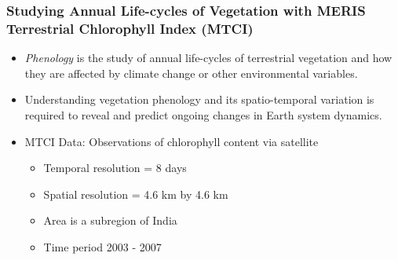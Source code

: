 \documentclass{beamer}
\begin{document}



\begin{frame}
\frametitle{Studying Annual Life-cycles of Vegetation with MERIS Terrestrial Chlorophyll Index (MTCI)}
\begin{itemize}
\item \emph{Phenology} is the study of annual life-cycles of terrestrial vegetation and how they are affected by climate change or other environmental variables.

\item Understanding vegetation phenology and its spatio-temporal variation is required to reveal and predict ongoing changes in Earth system dynamics. \\[0.5cm]

\item MTCI Data: Observations of chlorophyll content via satellite
\begin{itemize}
	\item Temporal resolution = 8 days
	\item Spatial resolution = 4.6 km by 4.6 km
	\item Area is a subregion of India
	\item Time period 2003 - 2007
\end{itemize}
\end{itemize}
\end{frame}
\end{document}
